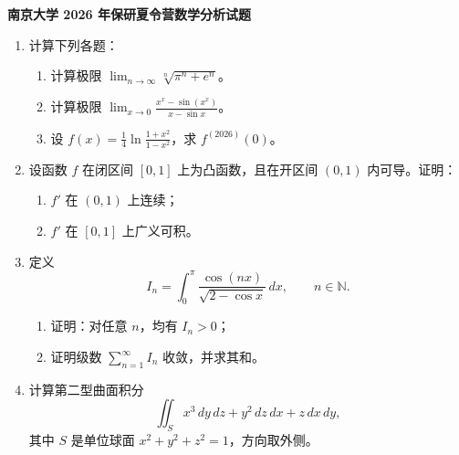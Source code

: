 \documentclass[UTF8,11pt,fontset=none]{ctexart}
\begin{document}
\begin{center}
  {\Large\bfseries 南京大学 2026 年保研夏令营数学分析试题}
\end{center}
\vspace{1.2em}

\begin{enumerate}
\item 计算下列各题：
  \begin{enumerate}[label=(\arabic*),itemsep=.5em]
  \item 计算极限 $\displaystyle\lim_{n\to\infty}\sqrt[n]{\pi^n+e^n}$。
  \item 计算极限 $\displaystyle\lim_{x\to0}\frac{x^x-\sin(x^x)}{x-\sin x}$。
  \item 设 $\displaystyle f(x)=\frac14\ln\frac{1+x^2}{1-x^2}$，求 $f^{(2026)}(0)$。
  \end{enumerate}

\item 设函数 $f$ 在闭区间 $[0,1]$ 上为凸函数，且在开区间 $(0,1)$ 内可导。证明：
  \begin{enumerate}[label=(\arabic*),itemsep=.3em]
  \item $f'$ 在 $(0,1)$ 上连续；
  \item $f'$ 在 $[0,1]$ 上广义可积。
  \end{enumerate}

\item 定义
\[
  I_n=\int_0^\pi\frac{\cos(nx)}{\sqrt{2-\cos x}}\,dx,
  \qquad n\in\mathbb N.
\]
  \begin{enumerate}[label=(\arabic*),itemsep=.3em]
  \item 证明：对任意 $n$，均有 $I_n>0$；
  \item 证明级数 $\displaystyle\sum_{n=1}^{\infty}I_n$ 收敛，并求其和。
  \end{enumerate}

\item 计算第二型曲面积分
\[
  \iint_S x^3\,dy\,dz+y^2\,dz\,dx+z\,dx\,dy,
\]
其中 $S$ 是单位球面 $x^2+y^2+z^2=1$，方向取外侧。
\end{enumerate}
\end{document}
